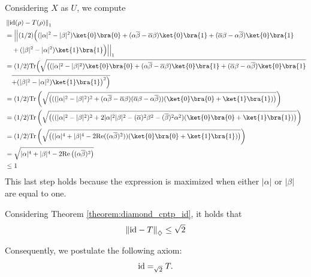 Considering $X$ as $U$, we compute
\begin{align*}
  &  \tracenorm{ \id(\rho) - T(\rho)} \\
  &  = \Big|\Big| (1/2) \Big( (|\alpha|^2 -|\beta|^2) \ket{0}\bra{0} + (\alpha \overline{\beta}-\overline{\alpha} \beta)\ket{0}\bra{1} + (\overline{\alpha} \beta-\alpha \overline{\beta})\ket{0}\bra{1}    \\
  & \hspace{10pt}  + (|\beta|^2 -|\alpha|^2 )\ket{1}\bra{1} \Big) \Big|\Big|_1  \\
  &  = (1/2) \tr \Big( \sqrt{\big( (|\alpha|^2 -|\beta|^2) \ket{0}\bra{0} + (\alpha \overline{\beta}-\overline{\alpha} \beta)\ket{0}\bra{1} + (\overline{\alpha} \beta-\alpha \overline{\beta})\ket{0}\bra{1} }  \\
  & \hspace{10pt} \overline{+(|\beta|^2 -|\alpha|^2 )\ket{1}\bra{1}   \big)^2\Big)}\\
  &  = (1/2) \tr \left( \sqrt{\left( ((|\alpha|^2 -|\beta|^2 )^2 + (\alpha \overline{\beta}-\overline{\alpha} \beta)(\overline{\alpha} \beta-\alpha \overline{\beta}))  (\ket{0}\bra{0} + \ket{1}\bra{1})  \right)}\right)  \\
  &  = (1/2) \tr \left( \sqrt{\left( ((|\alpha|^2 -|\beta|^2 )^2 + 2|\alpha|^2|\beta|^2 - (\overline{\alpha})^{2}\beta^2 -  (\overline{\beta})^{2}\alpha^2 )  (\ket{0}\bra{0} + \ket{1}\bra{1})  \right)}\right) \\
  &  = (1/2) \tr \left( \sqrt{\left( (|\alpha|^4+ |\beta|^4 - 2 \text{Re}((\alpha\overline{\beta})^2 ) )  (\ket{0}\bra{0} + \ket{1}\bra{1})  \right)}\right) \\
  & =  \sqrt{|\alpha|^4+ |\beta|^4 - 2 \text{Re}\left((\alpha\overline{\beta})^2 \right)} \\
  & \leq 1
\end{align*}
This last step holds because the expression is maximized when either $|\alpha|$ or $|\beta|$ are equal to one.

Considering Theorem \ref{theorem:diamond_cptp_id}, it holds that
\begin{align*}
  \left\lVert  \mathrm{id} - T \right\rVert_{\diamondsuit} \leq \sqrt{2}
\end{align*}

Consequently, we postulate the following axiom:
    \begin{align} \label{eq:t_teleport}
        \mathrm{id} =_{ \sqrt{2}} T.
    \end{align}

